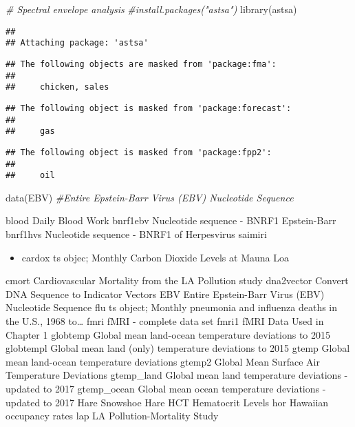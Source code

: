 \documentclass[
]{book}
\newenvironment{Shaded}{\begin{snugshade}}{\end{snugshade}}
\newcommand{\CommentTok}[1]{\textcolor[rgb]{0.56,0.35,0.01}{\textit{#1}}}
\newcommand{\FunctionTok}[1]{\textcolor[rgb]{0.00,0.00,0.00}{#1}}
\newcommand{\NormalTok}[1]{#1}
\providecommand{\tightlist}{%
  \setlength{\itemsep}{0pt}\setlength{\parskip}{0pt}}
\begin{document}
\begin{Shaded}
\begin{Highlighting}[]
\CommentTok{\# Spectral envelope analysis}
\CommentTok{\#install.packages("astsa")}
\FunctionTok{library}\NormalTok{(astsa)}
\end{Highlighting}
\end{Shaded}

\begin{verbatim}
## 
## Attaching package: 'astsa'
\end{verbatim}

\begin{verbatim}
## The following objects are masked from 'package:fma':
## 
##     chicken, sales
\end{verbatim}

\begin{verbatim}
## The following object is masked from 'package:forecast':
## 
##     gas
\end{verbatim}

\begin{verbatim}
## The following object is masked from 'package:fpp2':
## 
##     oil
\end{verbatim}

\begin{Shaded}
\begin{Highlighting}[]
\FunctionTok{data}\NormalTok{(EBV) }\CommentTok{\#Entire Epstein{-}Barr Virus (EBV) Nucleotide Sequence}
\end{Highlighting}
\end{Shaded}

blood Daily Blood Work
bnrf1ebv Nucleotide sequence - BNRF1 Epstein-Barr
bnrf1hvs Nucleotide sequence - BNRF1 of Herpesvirus saimiri

\begin{itemize}
\tightlist
\item
  cardox ts objec; Monthly Carbon Dioxide Levels at Mauna Loa
\end{itemize}

cmort Cardiovascular Mortality from the LA Pollution study
dna2vector Convert DNA Sequence to Indicator Vectors
EBV Entire Epstein-Barr Virus (EBV) Nucleotide Sequence
flu ts object; Monthly pneumonia and influenza deaths in the U.S., 1968 to\ldots{}
fmri fMRI - complete data set
fmri1 fMRI Data Used in Chapter 1
globtemp Global mean land-ocean temperature deviations to 2015
globtempl Global mean land (only) temperature deviations to 2015
gtemp Global mean land-ocean temperature deviations
gtemp2 Global Mean Surface Air Temperature Deviations
gtemp\_land Global mean land temperature deviations - updated to 2017
gtemp\_ocean Global mean ocean temperature deviations - updated to 2017
Hare Snowshoe Hare
HCT Hematocrit Levels
hor Hawaiian occupancy rates
lap LA Pollution-Mortality Study
\end{document}
